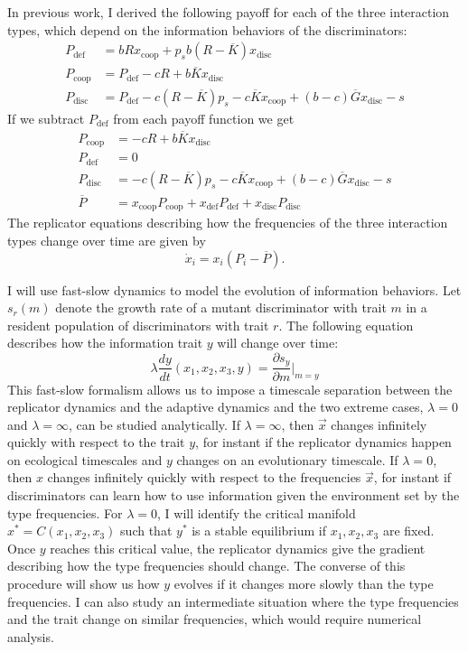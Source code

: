 \documentclass{article}
\begin{document}
In previous work, I derived the following payoff for each of the three interaction types, which depend on the information behaviors of the discriminators: 
\begin{align*}
P_{\text{def}}&=bRx_{\text{coop}}+p_sb(R-\overline{K})x_{\text{disc}}
\\P_{\text{coop}}&=P_\text{def}-cR+b\overline{K}x_{\text{disc}}
\\P_{\text{disc}}&=P_\text{def}-c(R-\overline{K})p_s-c\overline{K}x_\text{coop}+(b-c)\overline{G}x_\text{disc}-s
\end{align*}
If we subtract $P_\text{def}$ from each payoff function we get
\begin{align*}
P_\text{coop}&=-cR+b\overline{K}x_\text{disc}
\\ P_\text{def}&=0
\\ P_\text{disc}&=-c(R-\overline{K})p_s-c\overline{K}x_\text{coop}+(b-c)\overline{G}x_\text{disc}-s
\\\overline{P}&=x_{\text{coop}}P_{\text{coop}}+x_{\text{def}}P_{\text{def}}+x_{\text{disc}}P_{\text{disc}}
\end{align*}  
The replicator equations describing how the frequencies of the three interaction types change over time are given by 
\begin{equation}
\dot{x}_i=x_i(P_i-\overline{P}). \label{replicator}
\end{equation}

I will use fast-slow dynamics to model the evolution of information behaviors. Let $s_r(m)$ denote the growth rate of a mutant discriminator with trait $m$ in a resident population of discriminators with trait $r$. The following equation describes how the information trait $y$ will change over time:
\begin{equation}
\lambda \frac{dy}{dt}(x_1,x_2,x_3,y)=\frac{\partial s_{y}}{\partial m}\bigg|_{m=y}
\end{equation}
This fast-slow formalism allows us to impose a timescale separation between the replicator dynamics and the adaptive dynamics and the two extreme cases, $\lambda=0$ and $\lambda=\infty$, can be studied analytically.  If $\lambda=\infty$, then $\vec{x}$ changes infinitely quickly with respect to the trait $y$, for instant if the replicator dynamics happen on ecological timescales and $y$ changes on an evolutionary timescale.  If $\lambda=0$, then $x$ changes infinitely quickly with respect to the frequencies $\vec{x}$, for instant if discriminators can learn how to use information given the environment set by the type frequencies. For $\lambda=0$, I will identify the critical manifold $x^*=C(x_1,x_2,x_3)$ such that $y^*$ is a stable equilibrium if $x_1,x_2,x_3$ are fixed. Once $y$ reaches this critical value, the replicator dynamics give the gradient describing how the type frequencies should change. The converse of this procedure will show us how $y$ evolves if it changes more slowly than the type frequencies. I can also study an intermediate situation where the type frequencies and the trait change on similar frequencies, which would require numerical analysis.  
\end{document}

